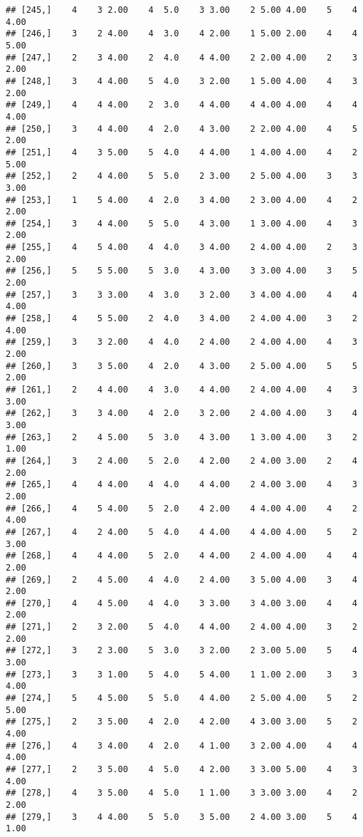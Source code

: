 \documentclass[]{article}
\begin{document}
\begin{verbatim}
## [245,]    4    3 2.00    4  5.0    3 3.00    2 5.00 4.00    5    4 4.00
## [246,]    3    2 4.00    4  3.0    4 2.00    1 5.00 2.00    4    4 5.00
## [247,]    2    3 4.00    2  4.0    4 4.00    2 2.00 4.00    2    3 2.00
## [248,]    3    4 4.00    5  4.0    3 2.00    1 5.00 4.00    4    3 2.00
## [249,]    4    4 4.00    2  3.0    4 4.00    4 4.00 4.00    4    4 4.00
## [250,]    3    4 4.00    4  2.0    4 3.00    2 2.00 4.00    4    5 2.00
## [251,]    4    3 5.00    5  4.0    4 4.00    1 4.00 4.00    4    2 5.00
## [252,]    2    4 4.00    5  5.0    2 3.00    2 5.00 4.00    3    3 3.00
## [253,]    1    5 4.00    4  2.0    3 4.00    2 3.00 4.00    4    2 2.00
## [254,]    3    4 4.00    5  5.0    4 3.00    1 3.00 4.00    4    3 2.00
## [255,]    4    5 4.00    4  4.0    3 4.00    2 4.00 4.00    2    3 2.00
## [256,]    5    5 5.00    5  3.0    4 3.00    3 3.00 4.00    3    5 2.00
## [257,]    3    3 3.00    4  3.0    3 2.00    3 4.00 4.00    4    4 4.00
## [258,]    4    5 5.00    2  4.0    3 4.00    2 4.00 4.00    3    2 4.00
## [259,]    3    3 2.00    4  4.0    2 4.00    2 4.00 4.00    4    3 2.00
## [260,]    3    3 5.00    4  2.0    4 3.00    2 5.00 4.00    5    5 2.00
## [261,]    2    4 4.00    4  3.0    4 4.00    2 4.00 4.00    4    3 3.00
## [262,]    3    3 4.00    4  2.0    3 2.00    2 4.00 4.00    3    4 3.00
## [263,]    2    4 5.00    5  3.0    4 3.00    1 3.00 4.00    3    2 1.00
## [264,]    3    2 4.00    5  2.0    4 2.00    2 4.00 3.00    2    4 2.00
## [265,]    4    4 4.00    4  4.0    4 4.00    2 4.00 3.00    4    3 2.00
## [266,]    4    5 4.00    5  2.0    4 2.00    4 4.00 4.00    4    2 4.00
## [267,]    4    2 4.00    5  4.0    4 4.00    4 4.00 4.00    5    2 3.00
## [268,]    4    4 4.00    5  2.0    4 4.00    2 4.00 4.00    4    4 2.00
## [269,]    2    4 5.00    4  4.0    2 4.00    3 5.00 4.00    3    4 2.00
## [270,]    4    4 5.00    4  4.0    3 3.00    3 4.00 3.00    4    4 2.00
## [271,]    2    3 2.00    5  4.0    4 4.00    2 4.00 4.00    3    2 2.00
## [272,]    3    2 3.00    5  3.0    3 2.00    2 3.00 5.00    5    4 3.00
## [273,]    3    3 1.00    5  4.0    5 4.00    1 1.00 2.00    3    3 4.00
## [274,]    5    4 5.00    5  5.0    4 4.00    2 5.00 4.00    5    2 5.00
## [275,]    2    3 5.00    4  2.0    4 2.00    4 3.00 3.00    5    2 4.00
## [276,]    4    3 4.00    4  2.0    4 1.00    3 2.00 4.00    4    4 4.00
## [277,]    2    3 5.00    4  5.0    4 2.00    3 3.00 5.00    4    3 4.00
## [278,]    4    3 5.00    4  5.0    1 1.00    3 3.00 3.00    4    2 2.00
## [279,]    3    4 4.00    5  5.0    3 5.00    2 4.00 3.00    5    4 1.00

\end{verbatim}
\end{document}
